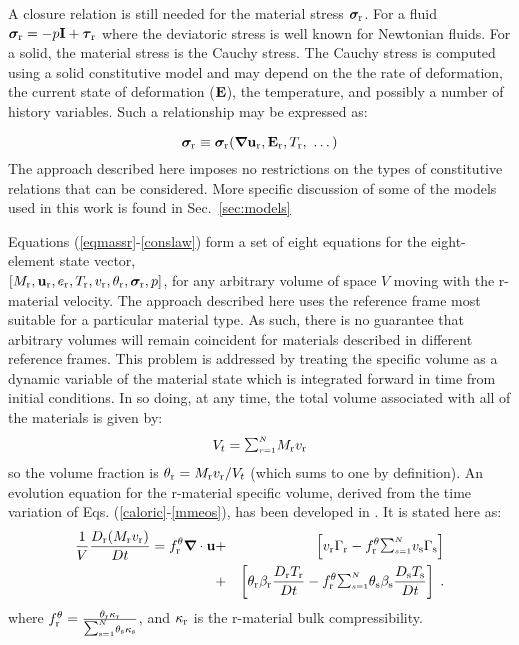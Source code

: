 A closure relation is still needed for the material stress $\mbox{\boldmath $\sigma \!\!$ \unboldmath}_{\rm r}$.  For a fluid $\mbox{\boldmath $\sigma \!\!$ \unboldmath}_{\rm r} = -p{\bf I} + \mbox{\boldmath $\tau \!\!$ \unboldmath}_{\rm r}$ where the deviatoric stress is well known for Newtonian fluids.  For a solid, the material stress is the Cauchy stress.  The Cauchy stress is computed using a solid constitutive model and may depend on the the rate of deformation, the current state of deformation (${\bf E}$), the temperature, and possibly a number of history variables.  Such a relationship may be expressed as:

%
\begin{equation}
{\mbox{\boldmath $\sigma \!\!$ \unboldmath}}_{\rm r} \equiv \mbox{\boldmath $\sigma \!\!$ \unboldmath}_{\rm r}(\mbox {\boldmath $\nabla \!\!$ \unboldmath}{\bf u}_{\rm r}, {\bf E}_{\rm r}, T_{\rm r},~ \dots)
\label{conslaw}
\end{equation}
%
The approach described here imposes no restrictions on the types of constitutive relations that can be considered.  More specific discussion of some of the models used in this work is found in Sec.~\ref{sec:models}

Equations (\ref{eqmassr}-\ref{conslaw}) form a set of eight equations for the eight-element state vector, \\ $[M_{\rm r}, {\bf u}_{\rm r}, e_{\rm r}, T_{\rm r}, v_{\rm r}, \theta_{\rm r}, \mbox{\boldmath $\sigma \!\!$ \unboldmath}_{\rm r}, p]$, for any arbitrary volume of space $V$ moving with the r-material velocity.  The approach described here uses the reference frame most suitable for a particular material type.  As such, there is no guarantee that arbitrary volumes will remain coincident for materials described in different reference frames.  This problem is addressed by treating the specific volume as a dynamic variable of the material state which is integrated forward in time from initial conditions.  In so doing, at any time, the total volume associated with all of the materials is given by:
%
\begin{eqnarray}
V_t = {\raise1.5pt\hbox{$\scriptstyle\sum_{r=1}^N$}} M_\rmr v_\rmr
\end{eqnarray}
%
so the volume fraction is $\theta_{\rm r} = M_{\rm r} v_{\rm r} / V_t$ (which sums to one by definition).  An evolution equation for the r-material specific volume, derived from the time variation of Eqs. (\ref{caloric}-\ref{mmeos}), has been developed in \cite{kashiwa2000}.  It is stated here as:
%
\begin{eqnarray}
{1\over V}{D_\rmr (M_\rmr v_\rmr) \over Dt} =
f_\rmr^{\theta} \bnabla \cdot \bfu &+&
\left[v_\rmr \Gamma_\rmr -
f_\rmr^{\theta} \SUM
v_\rms \Gamma_\rms \right]  \nonumber \\ &+&
\left[\theta_\rmr
\beta_\rmr {D_\rmr T_\rmr\over Dt} -
f_\rmr^{\theta} \SUM
\theta_\rms \beta_\rms {D_\rms T_\rms\over Dt} \right] \; .
\label{eqspvolr}
\end{eqnarray}
%
where $f_\rmr^{\theta} = {{\theta_\rmr \kappa_\rmr} \over {\raise1pt\hbox{${\scriptstyle\sum_{\rms =1}^N}$}} \theta_\rms\kappa_\rms}$, and $\kappa_{\rm r}$ is the r-material bulk compressibility.

